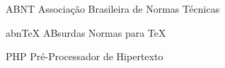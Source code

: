 \begin{siglas}
  \item[ABNT] Associação Brasileira de Normas Técnicas
  \item[abnTeX] ABsurdas Normas para TeX
  \item[PHP] Pré-Processador de Hipertexto
\end{siglas}